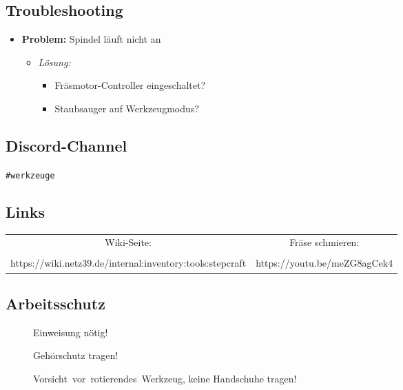 \documentclass{article}
\begin{document}
	\subsection*{Troubleshooting}
	\begin{itemize}
		\item \textbf{Problem:} Spindel läuft nicht an
		\begin{itemize}
			\item \textit{Lösung:}
			\begin{itemize}
				\item Fräsmotor-Controller eingeschaltet?
				\item Staubsauger auf Werkzeugmodus?
			\end{itemize}
		\end{itemize}
	\end{itemize}
	
	\subsection*{Discord-Channel}
		\colorbox{gray!30}{\texttt{\#werkzeuge}}
	
	\subsection*{Links}
	\begin{center}
		
		\renewcommand{\arraystretch}{2.0}
		\begin{tabular}{|c|c|}
			\hline
			Wiki-Seite: & Fräse schmieren: \\
			 &  \\
			https://wiki.netz39.de/internal:inventory:tools:stepcraft & https://youtu.be/meZG8agCek4 \\
			\hline
		\end{tabular}
	\end{center}
	
	\subsection*{Arbeitsschutz}
	\begin{figure}[h]
		\centering
		\begin{minipage}{0.33\textwidth}
			\centering
			
			\caption*{Einweisung nötig!}
		\end{minipage}%
		\begin{minipage}{0.33\textwidth}
			\centering
			
			\caption*{Gehörschutz tragen!}
		\end{minipage}
		\begin{minipage}{0.33\textwidth}
			\centering
			
			\caption*{\mbox{Vorsicht vor rotierendes Werkzeug}, keine Handschuhe tragen!}
		\end{minipage}
	\end{figure}
	
\end{document}
